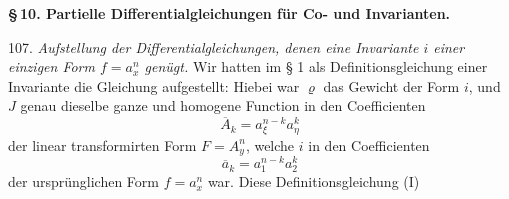 \begin{center}
\textbf{§\,10. Partielle Differentialgleichungen f\"ur Co- und Invarianten.}
\end{center}

107. \textit{Aufstellung der Differentialgleichungen, denen eine Invariante $i$ einer einzigen Form $f = a_x^n$ gen\"ugt.} Wir hatten im § 1 als Definitionsgleichung einer Invariante die Gleichung aufgestellt:
Hiebei war $\varrho$ das Gewicht der Form $i$, und $J$ genau dieselbe ganze und homogene Function in den Coefficienten
\[
\overline{A}_k = a_{\xi}^{n-k} a_{\eta}^k
\]
der linear transformirten Form $F = A_y^n$, welche $i$ in den Coefficienten
\[
\overline{a}_k = a_1^{n-k} a_2^k
\]
der urspr\"unglichen Form $f = a_x^n$ war. Diese Definitionsgleichung (I)


